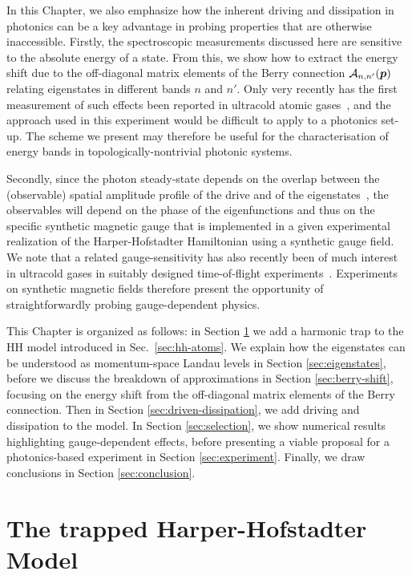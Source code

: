 In this Chapter, we also emphasize how the inherent driving and
dissipation in photonics can be a key advantage in probing properties
that are otherwise inaccessible.  Firstly, the spectroscopic
measurements discussed here are sensitive to the absolute energy of a
state. From this, we show how to extract the energy shift due to the
off-diagonal matrix elements of the Berry connection
$\mathcal{A}_{n,n'}(\bm{p})$ relating eigenstates in different bands $n$
and $n'$. Only very recently has the first measurement of such effects
been reported in ultracold atomic
gases~\cite{Grusdt2014nonabelian,tracy2015arxiv}, and the approach
used in this experiment would be difficult to apply to a photonics
set-up. The scheme we present may therefore be useful for the
characterisation of energy bands in topologically-nontrivial photonic
systems.

Secondly, since the photon steady-state depends on the overlap between
the (observable) spatial amplitude profile of the drive and of the
eigenstates~\cite{carusotto2013fluids}, the observables will depend on
the phase of the eigenfunctions and thus on the specific synthetic
magnetic gauge that is implemented in a given experimental realization
of the Harper-Hofstadter Hamiltonian using a synthetic gauge field. We
note that a related gauge-sensitivity has also recently been of much
interest in ultracold gases in suitably designed time-of-flight
experiments~\cite{kennedy2015bec,spielman2011gauge, spielman_gauge,
tomoki2015nv}. Experiments on synthetic magnetic fields therefore
present the opportunity of straightforwardly probing gauge-dependent
physics.

This Chapter is organized as follows: in Section \ref{sec:model} we
add a harmonic trap to the HH model introduced in
Sec.~\ref{sec:hh-atoms}. We explain how the eigenstates can be
understood as momentum-space Landau levels in Section
\ref{sec:eigenstates}, before we discuss the breakdown of
approximations in Section \ref{sec:berry-shift}, focusing on the
energy shift from the off-diagonal matrix elements of the Berry
connection. Then in Section \ref{sec:driven-dissipation}, we add
driving and dissipation to the model. In Section \ref{sec:selection},
we show numerical results highlighting gauge-dependent effects, before
presenting a viable proposal for a photonics-based experiment in
Section \ref{sec:experiment}. Finally, we draw conclusions in Section
\ref{sec:conclusion}.


\section{The trapped Harper-Hofstadter Model}
\label{sec:model}

